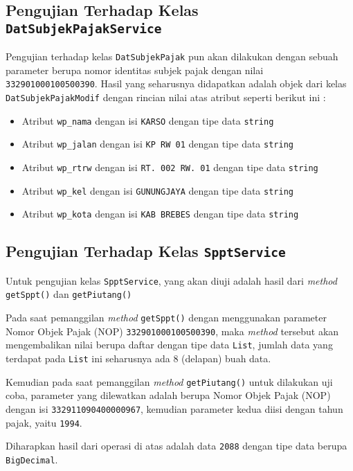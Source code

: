 \subsection{Pengujian Terhadap Kelas \texttt{DatSubjekPajakService}}

Pengujian terhadap kelas \texttt{DatSubjekPajak} pun akan dilakukan dengan sebuah parameter berupa nomor identitas subjek pajak dengan nilai \texttt{332901000100500390}. Hasil yang seharusnya didapatkan adalah objek dari kelas \texttt{DatSubjekPajakModif} dengan rincian nilai atas atribut seperti berikut ini :

\begin{itemize}
	\item Atribut \texttt{wp\_nama} dengan isi \texttt{KARSO} dengan tipe data \texttt{string}
	\item Atribut \texttt{wp\_jalan} dengan isi \texttt{KP RW 01} dengan tipe data \texttt{string}
	\item Atribut \texttt{wp\_rtrw} dengan isi \texttt{RT. 002 RW. 01} dengan tipe data \texttt{string}
	\item Atribut \texttt{wp\_kel} dengan isi \texttt{GUNUNGJAYA} dengan tipe data \texttt{string}
	\item Atribut \texttt{wp\_kota} dengan isi \texttt{KAB BREBES} dengan tipe data \texttt{string}
\end{itemize}

\subsection{Pengujian Terhadap Kelas \texttt{SpptService}}

Untuk pengujian kelas \texttt{SpptService}, yang akan diuji adalah hasil dari \textit{method} \texttt{getSppt()} dan \texttt{getPiutang()}

Pada saat pemanggilan \textit{method} \texttt{getSppt()} dengan menggunakan parameter Nomor Objek Pajak (NOP) \texttt{332901000100500390}, maka \textit{method} tersebut akan mengembalikan nilai berupa daftar dengan tipe data \texttt{List}, jumlah data yang terdapat pada \texttt{List} ini seharusnya ada 8 (delapan) buah data.

Kemudian pada saat pemanggilan \textit{method} \texttt{getPiutang()} untuk dilakukan uji coba, parameter yang dilewatkan adalah berupa Nomor Objek Pajak (NOP) dengan isi \texttt{332911090400000967}, kemudian parameter kedua diisi dengan tahun pajak, yaitu \texttt{1994}.

Diharapkan hasil dari operasi di atas adalah data \texttt{2088} dengan tipe data berupa \texttt{BigDecimal}.